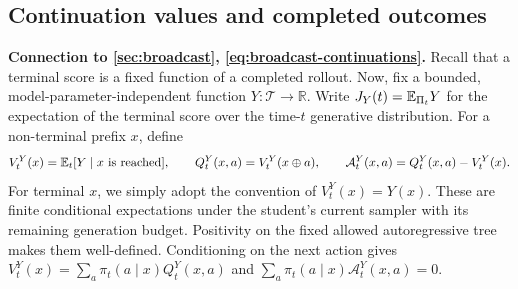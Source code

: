 \subsection{Continuation values and completed outcomes}
\label{app:outcome-proof}
\textbf{Connection to \cref{sec:broadcast}, \cref{eq:broadcast-continuations}.} Recall that a terminal score is a fixed function of a completed rollout. Now, fix a bounded, model-parameter-independent function $Y:\mathcal T\to\mathbb R$. Write $J_Y(t)=\mathbb{E}_{\Pi_t}Y$ for the expectation of the terminal score over the time-$t$ generative distribution. For a non-terminal prefix $x$, define
\[
 V_t^Y(x)=\mathbb{E}_t[Y\mid x\text{ is reached}],\qquad
 Q_t^Y(x,a)=V_t^Y(x\oplus a),\qquad
 \mathcal A_t^Y(x,a)=Q_t^Y(x,a)-V_t^Y(x).
\]
For terminal $x$, we simply adopt the convention of $V_t^Y(x)=Y(x)$. These are finite conditional expectations under the student's current sampler with its remaining generation budget. Positivity on the fixed allowed autoregressive tree makes them well-defined. Conditioning on the next action gives
$V_t^Y(x)=\sum_a\pi_t(a\mid x)Q_t^Y(x,a)$ and
$\sum_a\pi_t(a\mid x)\mathcal A_t^Y(x,a)=0$.

